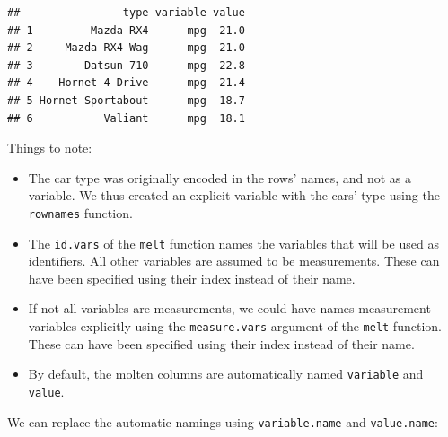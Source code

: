 \documentclass[]{book}
\newenvironment{Shaded}{\begin{snugshade}}{\end{snugshade}}
\newcommand{\KeywordTok}[1]{\textcolor[rgb]{0.13,0.29,0.53}{\textbf{#1}}}
\newcommand{\DataTypeTok}[1]{\textcolor[rgb]{0.13,0.29,0.53}{#1}}
\newcommand{\StringTok}[1]{\textcolor[rgb]{0.31,0.60,0.02}{#1}}
\newcommand{\OperatorTok}[1]{\textcolor[rgb]{0.81,0.36,0.00}{\textbf{#1}}}
\newcommand{\NormalTok}[1]{#1}
\providecommand{\tightlist}{%
  \setlength{\itemsep}{0pt}\setlength{\parskip}{0pt}}
\theoremstyle{definition}
\theoremstyle{definition}
\theoremstyle{definition}
\theoremstyle{remark}
\begin{document}
\begin{Shaded}
\end{Shaded}

\begin{verbatim}
##                type variable value
## 1         Mazda RX4      mpg  21.0
## 2     Mazda RX4 Wag      mpg  21.0
## 3        Datsun 710      mpg  22.8
## 4    Hornet 4 Drive      mpg  21.4
## 5 Hornet Sportabout      mpg  18.7
## 6           Valiant      mpg  18.1
\end{verbatim}

Things to note:

\begin{itemize}
\tightlist
\item
  The car type was originally encoded in the rows' names, and not as a
  variable. We thus created an explicit variable with the cars' type
  using the \texttt{rownames} function.
\item
  The \texttt{id.vars} of the \texttt{melt} function names the variables
  that will be used as identifiers. All other variables are assumed to
  be measurements. These can have been specified using their index
  instead of their name.
\item
  If not all variables are measurements, we could have names measurement
  variables explicitly using the \texttt{measure.vars} argument of the
  \texttt{melt} function. These can have been specified using their
  index instead of their name.
\item
  By default, the molten columns are automatically named
  \texttt{variable} and \texttt{value}.
\end{itemize}

We can replace the automatic namings using \texttt{variable.name} and
\texttt{value.name}:

\begin{Shaded}
\end{Shaded}
\end{document}
